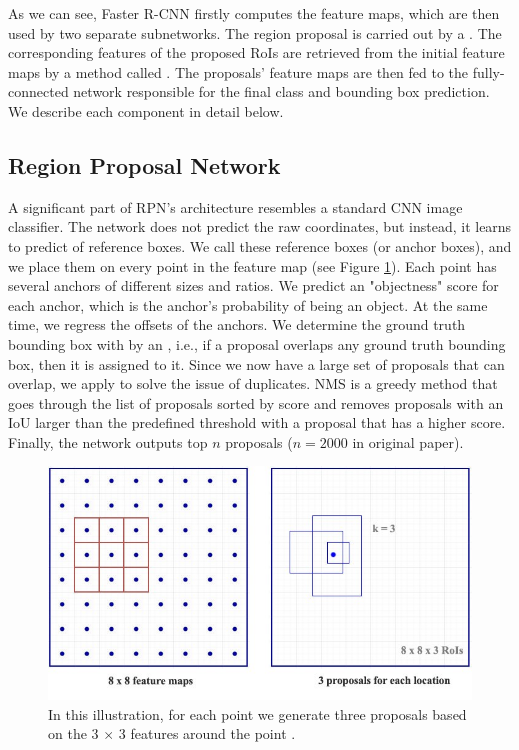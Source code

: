 As we can see, Faster R-CNN firstly computes the feature maps, which are then used by two separate subnetworks. The region proposal is carried out by a . The corresponding features of the proposed RoIs are retrieved from the initial feature maps by a method called . The proposals' feature maps are then fed to the fully-connected network responsible for the final class and bounding box prediction. We describe each component in detail below.

\subsection{Region Proposal Network}\label{rpn}
A significant part of RPN's architecture resembles a standard CNN image classifier. The network does not predict the raw coordinates, but instead, it learns to predict  of reference boxes. We call these reference boxes  (or anchor boxes), and we place them on every point in the feature map (see Figure \ref{fig:rpn}). Each point has several anchors of different sizes and ratios. We predict an "objectness" score for each anchor, which is the anchor's probability of being an object. At the same time, we regress the offsets of the anchors. We determine the ground truth bounding box with by an , i.e., if a proposal overlaps any ground truth bounding box, then it is assigned to it. Since we now have a large set of proposals that can overlap, we apply  to solve the issue of duplicates. NMS is a greedy method that goes through the list of proposals sorted by score and removes proposals with an IoU larger than the predefined threshold with a proposal that has a higher score. Finally, the network outputs top $n$ proposals ($n = 2000$ in original paper).

\begin{figure}[h]
    \centering
    \includegraphics[width=0.6\linewidth]{Sources/Figures/rpn.jpeg}
    \caption{In this illustration, for each point we generate three proposals based on the 3 $\times$ 3 features around the point \cite{huifasterrcnn}.}
    \label{fig:rpn}
\end{figure}

